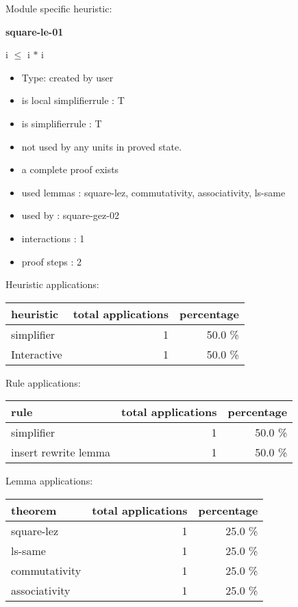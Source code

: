 \documentclass[a4paper]{article}
\begin{document}
Module specific heuristic:

\pagebreak

{\LARGE\bf square-le-01}\label{lemma-square-le-01}

\medskip

 \Fol i $\le$ i $*$ i

\begin{itemize}

\item Type: created by user

\item is local simplifierrule : T
\item is simplifierrule : T
\item not used by any units in proved state.
\item       a complete proof exists
\item       used lemmas  : square-lez, commutativity, associativity, ls-same
\item       used by      : square-gez-02
\item       interactions : 1
\item       proof steps  : 2
\end{itemize}

\medskip


Heuristic applications:

\begin{supertabular}{l|r|r}
heuristic	& total applications & percentage \\ \hline
simplifier & 1 & 50.0 \% \\
Interactive & 1 & 50.0 \% \\

\end{supertabular}

Rule applications:

\begin{supertabular}{l|r|r}
rule	        & total applications & percentage \\ \hline
simplifier & 1 & 50.0 \% \\
insert rewrite lemma & 1 & 50.0 \% \\

\end{supertabular}

Lemma applications:

\begin{supertabular}{l|r|r}
theorem	        & total applications & percentage \\ \hline
square-lez & 1 & 25.0 \% \\
ls-same & 1 & 25.0 \% \\
commutativity & 1 & 25.0 \% \\
associativity & 1 & 25.0 \% \\

\end{supertabular}
\end{document}
